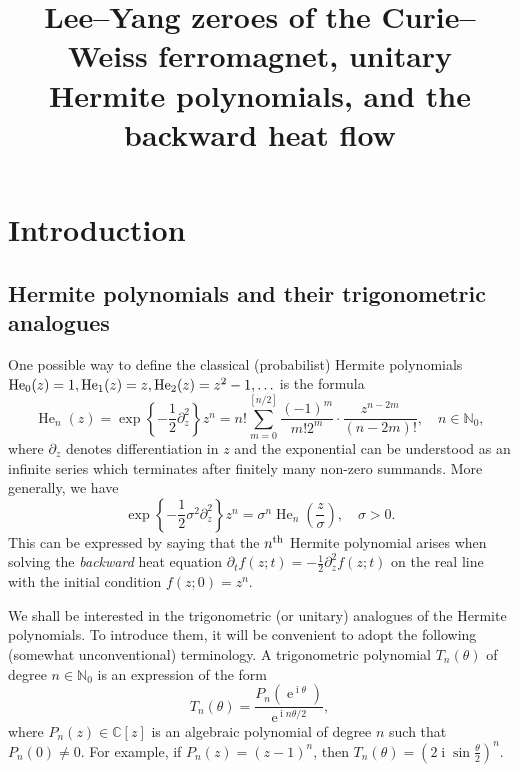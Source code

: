 \documentclass[AHL,Unicode,longabstracts,published]{cedram}
\title[Unitary Hermite polynomials]{Lee--Yang zeroes of the Curie--Weiss ferromagnet, unitary Hermite polynomials, and the backward heat flow}
\author[\initial{Z.} \lastname{Kabluchko}]{\firstname{Zakhar} \lastname{Kabluchko}}
\DeclareMathOperator*{\He}{He}
\DeclareMathOperator{\eee}{e}
\DeclareMathOperator{\ii}{i}
\newcommand{\N}{\mathbb{N}}
\newcommand{\C}{\mathbb{C}}
\begin{document}
\maketitle

\section{Introduction}
\subsection{Hermite polynomials and their trigonometric analogues}

One possible way to define the classical (probabilist) Hermite polynomials $\He_0(z)\linebreak = 1, \He_1(z) = z, \He_2(z)=z^2-1,\ldots$ is the formula
\begin{equation}\label{eq:hermite_poly_def}
\He\nolimits_n(z) =
\exp\left\{-\frac 1 2 \partial_z^2\right\} z^n = n! \sum_{m=0}^{[n/2]} \frac{(-1)^m }{m! 2^m} \cdot \frac{z^{n-2m}}{(n-2m)!},
\quad n\in \N_0,
\end{equation}
where $\partial_z$ denotes differentiation in $z$ and the exponential can be understood as an infinite series which terminates after finitely many non-zero summands. More generally, we have
\begin{equation}\label{eq:eq:hermite_exp_on_z^n_with_sigma}
\exp\left\{-\frac{1}{2}\sigma^2 \partial_z^2\right\} z^n = \sigma^n \He\nolimits_n\left(\frac{z}{\sigma}\right), \quad \sigma >0.
\end{equation}
This can be expressed by saying that the $n^{\text{\normalfont th}}$ Hermite polynomial arises when solving the \emph{backward} heat equation $\partial_t f(z; t) = -\frac 12 \partial^2_z f(z;t)$ on the real line with the initial condition $f(z;0) = z^n$.


We shall be interested in the trigonometric (or unitary) analogues of the Hermite polynomials. To introduce them, it will be convenient to adopt the following (somewhat unconventional) terminology. A trigonometric polynomial $T_n(\theta)$ of degree $n\in \N_0$ is an expression of the form
\begin{equation}\label{eq:algebraic_trigonometric}
T_n(\theta) = \frac{P_n(\eee^{\ii \theta})}{\eee^{\ii n \theta/2}},
\end{equation}
where $P_n(z)\in \C[z]$ is an algebraic polynomial of degree $n$ such that $P_n(0)\neq 0$. For example, if $P_n(z) = (z-1)^n$, then $T_n(\theta) = (2\ii \sin \frac \theta 2)^n$.
\end{document}
